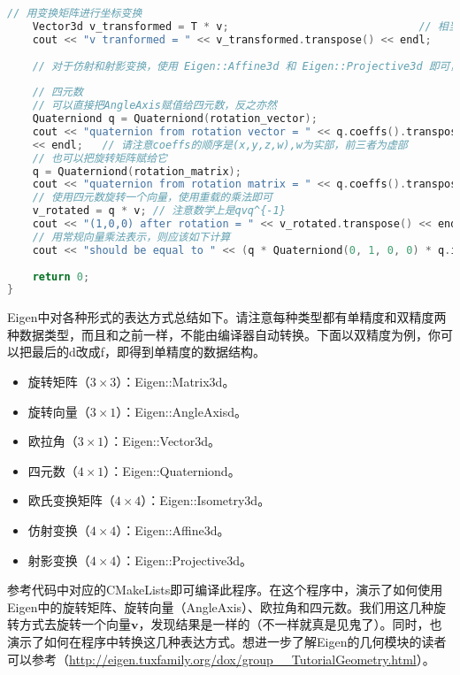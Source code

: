 \begin{lstlisting}[language=c++,caption=slambook2/ch3/useGeometry/useGeometry.cpp]
    // 用变换矩阵进行坐标变换
    Vector3d v_transformed = T * v;                              // 相当于R*v+t
    cout << "v tranformed = " << v_transformed.transpose() << endl;
    
    // 对于仿射和射影变换，使用 Eigen::Affine3d 和 Eigen::Projective3d 即可，略
    
    // 四元数
    // 可以直接把AngleAxis赋值给四元数，反之亦然
    Quaterniond q = Quaterniond(rotation_vector);
    cout << "quaternion from rotation vector = " << q.coeffs().transpose()
    << endl;   // 请注意coeffs的顺序是(x,y,z,w),w为实部，前三者为虚部
    // 也可以把旋转矩阵赋给它
    q = Quaterniond(rotation_matrix);
    cout << "quaternion from rotation matrix = " << q.coeffs().transpose() << endl;
    // 使用四元数旋转一个向量，使用重载的乘法即可
    v_rotated = q * v; // 注意数学上是qvq^{-1}
    cout << "(1,0,0) after rotation = " << v_rotated.transpose() << endl;
    // 用常规向量乘法表示，则应该如下计算
    cout << "should be equal to " << (q * Quaterniond(0, 1, 0, 0) * q.inverse()).coeffs().transpose() << endl;
    
    return 0;
}
\end{lstlisting}

Eigen中对各种形式的表达方式总结如下。请注意每种类型都有单精度和双精度两种数据类型，而且和之前一样，不能由编译器自动转换。下面以双精度为例，你可以把最后的d改成f，即得到单精度的数据结构。
\begin{itemize}
	\item 旋转矩阵（$3 \times 3$）：Eigen::Matrix3d。
	\item 旋转向量（$3 \times 1$）：Eigen::AngleAxisd。
	\item 欧拉角（$3 \times 1$）：Eigen::Vector3d。
	\item 四元数（$4 \times 1$）：Eigen::Quaterniond。
	\item 欧氏变换矩阵（$4 \times 4$）：Eigen::Isometry3d。
	\item 仿射变换（$4 \times 4$）：Eigen::Affine3d。
	\item 射影变换（$4 \times 4$）：Eigen::Projective3d。
\end{itemize}

参考代码中对应的CMakeLists即可编译此程序。在这个程序中，演示了如何使用Eigen中的旋转矩阵、旋转向量（AngleAxis）、欧拉角和四元数。我们用这几种旋转方式去旋转一个向量$\bm{v}$，发现结果是一样的（不一样就真是见鬼了）。同时，也演示了如何在程序中转换这几种表达方式。想进一步了解Eigen的几何模块的读者可以参考（\url{http://eigen.tuxfamily.org/dox/group__TutorialGeometry.html}）。


